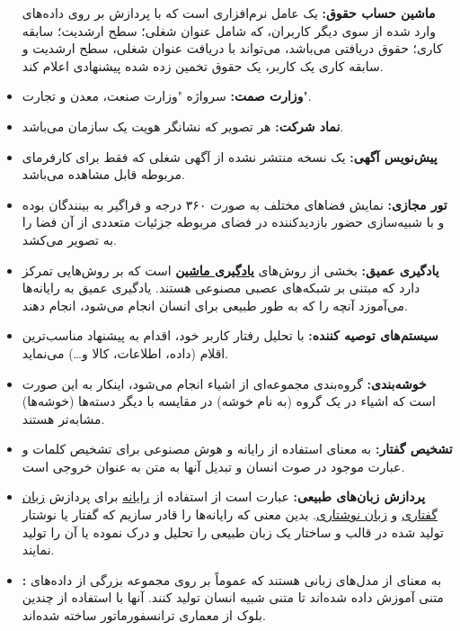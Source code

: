 \documentclass[12pt]{article}
\begin{document}
\begin{itemize}
		\textbf{ماشین حساب حقوق:}
		یک عامل نرم‌افزاری است که با پردازش بر روی داده‌های وارد شده از سوی دیگر کاربران، که شامل عنوان شغلی؛ سطح ارشدیت؛ سابقه کاری؛ حقوق دریافتی می‌باشد، می‌تواند با دریافت عنوان شغلی، سطح ارشدیت و سابقه کاری یک کاربر، یک حقوق تخمین زده شده پیشنهادی اعلام کند.
		\item
		\textbf{وزارت صمت:}
		سرواژه "وزارت صنعت، معدن و تجارت".
		\item
		\textbf{نماد شرکت:}
		هر تصویر که نشانگر هویت یک سازمان می‌باشد.
		\item
		\textbf{پیش‌نویس آگهی:}
		یک نسخه منتشر نشده از آگهی شغلی که فقط برای کارفرمای مربوطه قابل مشاهده می‌باشد.
		\item
		\textbf{تور مجازی:‌}
		نمایش فضاهای مختلف به صورت ۳۶۰ درجه و فراگیر به بینندگان بوده و با شبیه‌سازی حضور بازدیدکننده در فضای مربوطه جزئیات متعددی از آن فضا را به تصویر می‌کشد.
		\item
		\textbf{یادگیری عمیق:}
		بخشی از روش‌های \textbf{\hyperref[ref:ml]{یادگیری ماشین}} است که بر روش‌هایی تمرکز دارد که مبتنی بر شبکه‌های عصبی مصنوعی هستند. یادگیری عمیق به رایانه‌ها می‌آموزد آنچه را که به طور طبیعی برای انسان انجام می‌شود، انجام دهند.
		\item
		\textbf{سیستم‌های توصیه کننده:}
		با تحلیل رفتار کاربر خود، اقدام به پیشنهاد مناسب‌ترین اقلام (داده، اطلاعات، کالا و…) می‌نماید.
		\item
		\textbf{خوشه‌بندی:}
		گروه‌بندی مجموعه‌ای از اشیاء انجام می‌شود، اینکار به این صورت است که اشیاء در یک گروه (به نام خوشه) در مقایسه با دیگر دسته‌ها (خوشه‌ها) مشابه‌تر هستند.
		\item
		\textbf{تشخیص گفتار:}
		به معنای استفاده از رایانه و هوش مصنوعی برای تشخیص کلمات و عبارت موجود در صوت انسان و تبدیل آنها به متن به عنوان خروجی است.
		\item
		\textbf{پردازش زبان‌های طبیعی:}
		عبارت است از استفاده از
		\href{https://fa.wikipedia.org/wiki/%D8%B1%D8%A7%DB%8C%D8%A7%D9%86%D9%87}{رایانه}
		برای پردازش
		\href{https://fa.wikipedia.org/wiki/%D8%B2%D8%A8%D8%A7%D9%86_%DA%AF%D9%81%D8%AA%D8%A7%D8%B1%DB%8C}{زبان گفتاری}
		و
		\href{https://fa.wikipedia.org/wiki/%D8%B2%D8%A8%D8%A7%D9%86_%D9%86%D9%88%D8%B4%D8%AA%D8%A7%D8%B1%DB%8C}{زبان نوشتاری}. بدین معنی که رایانه‌ها را قادر سازیم که گفتار یا نوشتار تولید شده در قالب و ساختار یک زبان طبیعی را تحلیل و درک نموده یا آن را تولید نمایند.
		\item
		\textbf{:}
		به معنای
		از مدل‌های زبانی هستند که عموماً بر روی مجموعه بزرگی از داده‌های متنی آموزش داده شده‌اند تا متنی شبیه انسان تولید کنند. آنها با استفاده از چندین بلوک از معماری ترانسفورماتور ساخته شده‌اند.
	\end{itemize}
\end{document}
